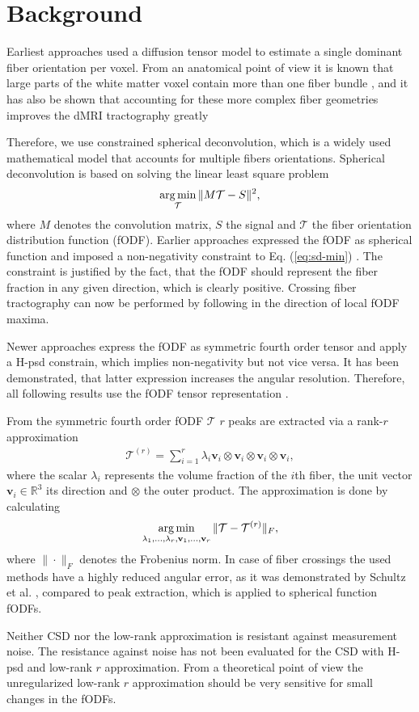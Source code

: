 \section{Background}\label{background}
Earliest approaches used a diffusion tensor model
\cite{LeBihan:1986,Mori:1999} to estimate a single dominant fiber orientation
per voxel. From an anatomical point of view it is known that large parts of the
white matter voxel contain more than one fiber bundle \cite{Jeurissen:2012}, and it has also be shown
that accounting for these more complex fiber geometries improves the dMRI
tractography greatly \cite{Neher:2015}

Therefore, we use constrained spherical deconvolution, which is a widely used
mathematical model that accounts for multiple fibers orientations.
Spherical deconvolution is based on solving the linear least square problem 
\begin{align}
	\operatorname*{arg\,min}_{\mathcal{T}} \| M \mathcal{T} - S \|^2,
	\label{eq:sd-min}
\end{align}
where 
$M$ denotes the convolution matrix, $S$ the signal and $\mathcal{T}$ the fiber
orientation distribution function (fODF).
Earlier approaches expressed the fODF as spherical function and imposed a
non-negativity constraint to Eq. (\ref{eq:sd-min}) \cite{TOURNIER20071459}. The
constraint is justified by
the fact, that the fODF should represent the fiber fraction in any given
direction, which is clearly positive. Crossing fiber tractography can now be
performed by following in the direction of local fODF maxima.

Newer approaches express the fODF as symmetric fourth order tensor and apply a
H-psd constrain, which implies non-negativity but not vice versa. It has been
demonstrated, that latter expression increases the angular resolution.
Therefore, all following results use the fODF tensor representation
\cite{Ankele:CARS2017}. 

From the symmetric fourth order fODF $\mathcal{T}$ $r$ peaks are extracted via a rank-$r$
approximation 
\begin{align}
	\mathcal{T}^{\left( r \right)} = \sum_{i=1}^r \lambda_i \mathbf{v}_i
	\otimes \mathbf{v}_i \otimes \mathbf{v}_i \otimes \mathbf{v}_i, 
	\label{eq:low-rank}
\end{align}
where the scalar $\lambda_i$ represents the volume fraction of the $i$th fiber,
the unit vector $\mathbf{v}_i \in \mathbb{R}^3$ its direction and $\otimes$ the
outer product. The approximation is done by calculating 
\[ \operatorname*{arg\,min}_{\lambda_1, \dots , \lambda_r , \mathbf{v}_1, \dots , \mathbf{v}_r}
\| \mathcal{T} - \mathcal{T}^{\left( r \right)} \|_F, \]
where $\| \cdot \|_F$ denotes the Frobenius norm. In case of fiber crossings the
used methods have a highly reduced angular error, as it was demonstrated by
Schultz et al. \cite{lowrank}, compared to peak extraction, which is applied to spherical function fODFs.

Neither CSD nor the low-rank approximation is resistant against
measurement noise. The resistance against noise has not been evaluated for the
CSD with H-psd and low-rank $r$ approximation. From a theoretical point of view
the unregularized low-rank $r$ approximation should be very sensitive for small
changes in the fODFs.
